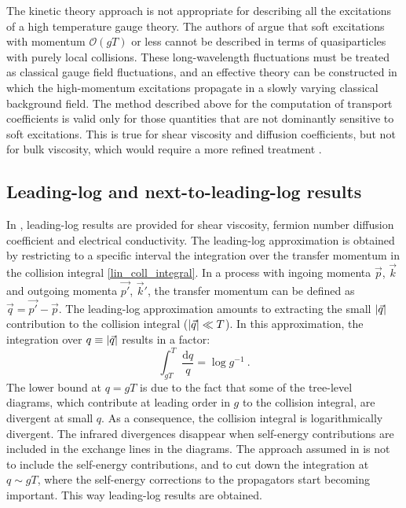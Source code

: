 The kinetic theory approach is not appropriate for describing all the excitations of a high temperature gauge theory. The authors of \cite{Arnold:2000dr,Arnold:2003zc} argue that soft excitations with momentum $\mathcal O(gT)$ or less cannot be described in terms of quasiparticles with purely local collisions. These long-wavelength fluctuations must be treated as classical gauge field fluctuations, and an effective theory can be constructed in which the high-momentum excitations propagate in a slowly varying classical background field. The method described above for the computation of transport coefficients is valid only for those quantities that are not dominantly sensitive to soft excitations. This is true for shear viscosity and diffusion coefficients, but not for bulk viscosity, which would require a more refined treatment \cite{Arnold:2000dr}.

 
\subsection{Leading-log and next-to-leading-log results}

In \cite{Arnold:2000dr}, leading-log results are provided for shear viscosity, fermion number diffusion coefficient and electrical conductivity. The leading-log approximation is obtained by restricting to a specific interval the integration over the transfer momentum in the collision integral \ref{lin_coll_integral}. In a process with ingoing momenta $\vec p$, $\vec k$ and outgoing momenta $\vec{p'}$, $\vec k'$, the transfer momentum can be defined as $\vec q = \vec{p'} - \vec p$. The leading-log approximation amounts to extracting the small $\abs{\vec q}$ contribution to the collision integral ($\abs{\vec q} \ll T$). In this approximation, the integration over $q \equiv \abs{\vec q}$ results in a factor:
\begin{equation}
\int_{gT}^T \frac{\mathrm d q}{q} = \log g^{-1} \: .
\end{equation}
%
The lower bound at $q = gT$ is due to the fact that some of the tree-level diagrams, which contribute at leading order in $g$ to the collision integral, are divergent at small $q$. As a consequence, the collision integral is logarithmically divergent. The infrared divergences disappear when self-energy contributions are included in the exchange lines in the diagrams. The approach assumed in \cite{Arnold:2000dr} is not to include the self-energy contributions, and to cut down the integration at $q \sim gT$, where the self-energy corrections to the propagators start becoming important. This way leading-log results are obtained.


